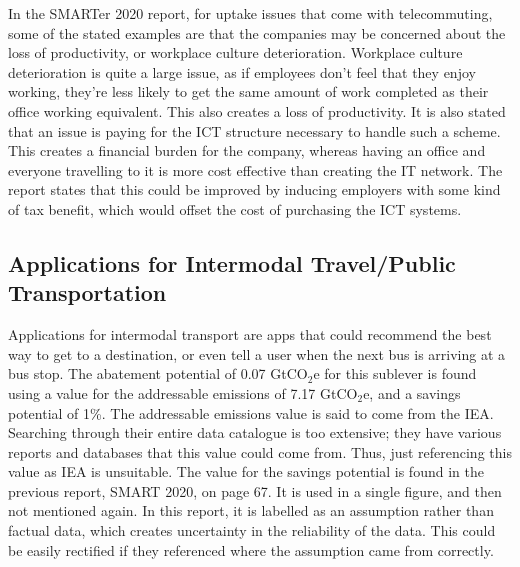 In the SMARTer 2020 report, for uptake issues that come with telecommuting, some of the stated examples are that the companies may be concerned about the loss of productivity, or workplace culture deterioration. Workplace culture deterioration is quite a large issue, as if employees don't feel that they enjoy working, they're less likely to get the same amount of work completed as their office working equivalent. This also creates a loss of productivity. It is also stated that an issue is paying for the ICT structure necessary to handle such a scheme. This creates a financial burden for the company, whereas having an office and everyone travelling to it is more cost effective than creating the IT network. The report states that this could be improved by inducing employers with some kind of tax benefit, which would offset the cost of purchasing the ICT systems. 


\subsection{Applications for Intermodal Travel/Public Transportation}
\label{sec:intermodal}
Applications for intermodal transport are apps that could recommend the best way to get to a destination, or even tell a user when the next bus is arriving at a bus stop.
The abatement potential of 0.07 GtCO$_2$e for this sublever is found using a value for the addressable emissions of 7.17 GtCO$_2$e, and a savings potential of 1\%. 
The addressable emissions value is said to come from the IEA. Searching through their entire data catalogue is too extensive; they have various reports and databases that this value could come from. Thus, just referencing this value as IEA is unsuitable. 
The value for the savings potential is found in the previous report, SMART 2020, on page 67. It is used in a single figure, and then not mentioned again. In this report, it is labelled as an assumption rather than factual data, which creates uncertainty in the reliability of the data. This could be easily rectified if they referenced where the assumption came from correctly. 


